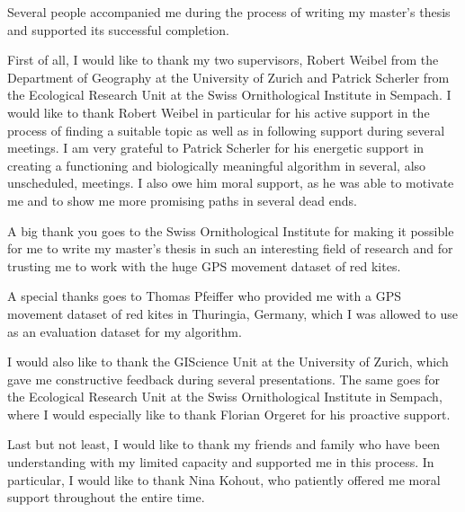 Several people accompanied me during the process of writing my master's thesis and supported its successful completion.

First of all, I would like to thank my two supervisors, Robert Weibel from the Department of Geography at the University of Zurich and Patrick Scherler from the Ecological Research Unit at the Swiss Ornithological Institute in Sempach. I would like to thank Robert Weibel in particular for his active support in the process of finding a suitable topic as well as in following support during several meetings. I am very grateful to Patrick Scherler for his energetic support in creating a functioning and biologically meaningful algorithm in several, also unscheduled, meetings. I also owe him moral support, as he was able to motivate me and to show me more promising paths in several dead ends.

A big thank you goes to the Swiss Ornithological Institute for making it possible for me to write my master's thesis in such an interesting field of research and for trusting me to work with the huge GPS movement dataset of red kites.

A special thanks goes to Thomas Pfeiffer who provided me with a GPS movement dataset of red kites in Thuringia, Germany, which I was allowed to use as an evaluation dataset for my algorithm.

I would also like to thank the GIScience Unit at the University of Zurich, which gave me constructive feedback during several presentations. The same goes for the Ecological Research Unit at the Swiss Ornithological Institute in Sempach, where I would especially like to thank Florian Orgeret for his proactive support.

Last but not least, I would like to thank my friends and family who have been understanding with my limited capacity and supported me in this process. In particular, I would like to thank Nina Kohout, who patiently offered me moral support throughout the entire time.